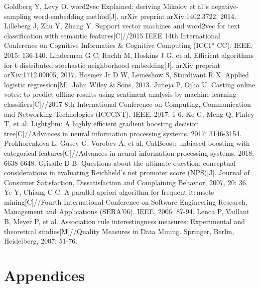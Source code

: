 \documentclass[12pt]{article}%
\begin{document}
\begin{thebibliography}{9}
	Goldberg Y, Levy O. word2vec Explained: deriving Mikolov et al.'s negative-sampling word-embedding method[J]. arXiv preprint arXiv:1402.3722, 2014.
	Lilleberg J, Zhu Y, Zhang Y. Support vector machines and word2vec for text classification with semantic features[C]//2015 IEEE 14th International Conference on Cognitive Informatics \& Cognitive Computing (ICCI* CC). IEEE, 2015: 136-140.
	Linderman G C, Rachh M, Hoskins J G, et al. Efficient algorithms for t-distributed stochastic neighborhood embedding[J]. arXiv preprint arXiv:1712.09005, 2017.
	Hosmer Jr D W, Lemeshow S, Sturdivant R X. Applied logistic regression[M]. John Wiley \& Sons, 2013.
	Juneja P, Ojha U. Casting online votes: to predict offline results using sentiment analysis by machine learning classifiers[C]//2017 8th International Conference on Computing, Communication and Networking Technologies (ICCCNT). IEEE, 2017: 1-6.
	Ke G, Meng Q, Finley T, et al. Lightgbm: A highly efficient gradient boosting decision tree[C]//Advances in neural information processing systems. 2017: 3146-3154.
	Prokhorenkova L, Gusev G, Vorobev A, et al. CatBoost: unbiased boosting with categorical features[C]//Advances in neural information processing systems. 2018: 6638-6648.
	Grisaffe D B. Questions about the ultimate question: conceptual considerations in evaluating Reichheld's net promoter score (NPS)[J]. Journal of Consumer Satisfaction, Dissatisfaction and Complaining Behavior, 2007, 20: 36.
	Ye Y, Chiang C C. A parallel apriori algorithm for frequent itemsets mining[C]//Fourth International Conference on Software Engineering Research, Management and Applications (SERA'06). IEEE, 2006: 87-94.
	Lenca P, Vaillant B, Meyer P, et al. Association rule interestingness measures: Experimental and theoretical studies[M]//Quality Measures in Data Mining. Springer, Berlin, Heidelberg, 2007: 51-76.
	
\end{thebibliography}


\newpage
\appendix
\section*{Appendices} 
\end{document}
